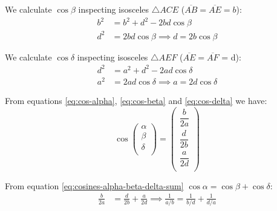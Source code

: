 \documentclass[11pt]{article}
\begin{document}
We calculate $\cos\beta$ inspecting isosceles $\triangle{ACE}$
($\overline{AB} = \overline{AE} = b$):
\begin{align}
b^2 &= b^2 + d^2 - 2bd\cos\beta \nonumber\\
d^2 &= 2bd\cos\beta \implies \boxed{d = 2b\cos\beta} \label{eq:cos-beta}
\end{align}

We calculate $\cos\delta$ inspecting isosceles $\triangle{AEF}$
($\overline{AE} = \overline{AF}$ = d):
\begin{align}
d^2 &= a^2 + d^2 - 2ad\cos\delta \nonumber\\
a^2 &= 2ad\cos\delta \implies \boxed{ a = 2d\cos\delta } \label{eq:cos-delta}
\end{align}

From equations \ref{eq:cos-alpha}, \ref{eq:cos-beta} and \ref{eq:cos-delta} we have:
\begin{equation}\label{eq:cos-alpha-beta-delta}
\cos\left({\begin{array}{c} \alpha\\ \beta\\ \delta\\ \end{array}}\right)
= \left({\begin{array}{c}
\dfrac{b}{2a}\\[10pt]
\dfrac{d}{2b}\\[10pt]
\dfrac{a}{2d}\\[10pt]
\end{array}}\right)
\end{equation}

From equation \ref{eq:cosines-alpha-beta-delta-sum} $\cos\alpha = \cos\beta + \cos\delta$:
\begin{align}
\frac{b}{2a} &= \frac{d}{2b} + \frac{a}{2d}
 \implies \boxed{ \frac{1}{a/b} = \frac{1}{b/d} + \frac{1}{d/a}}
\end{align}
\end{document}
